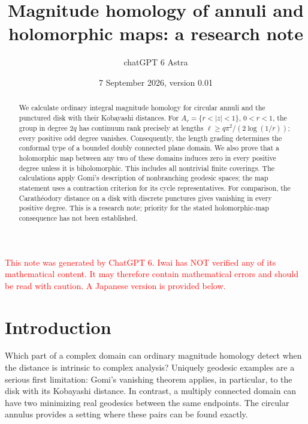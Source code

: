 \documentclass[12pt]{amsart}
\theoremstyle{definition}
\theoremstyle{remark}
\numberwithin{equation}{section}
\newcommand{\xr}[1]{\textcolor{red}{#1}}
\let\MergedMakeTitle\maketitle
\renewcommand{\maketitle}{\MergedMakeTitle\markboth{chatGPT 6 Astra}{\shorttitle}}%
\newcommand{\MergedLanguage}{en}
\newcommand{\MergedStart}[1]{%
  \def\MergedLanguage{#1}%
  \def\authors{}\def\shortauthors{}\def\addresses{}%
  \setcounter{section}{0}\setcounter{subsection}{0}\setcounter{subsubsection}{0}%
  \setcounter{thm}{0}\setcounter{equation}{0}%
  \setcounter{cl}{0}\setcounter{step}{0}\setcounter{case}{0}%
  \setcounter{figure}{0}\setcounter{table}{0}\setcounter{footnote}{0}%
}
\begin{document}
\begingroup
\MergedStart{en}
\title[Magnitude homology of annuli]{Magnitude homology of annuli and holomorphic maps: a research note}
\author{chatGPT 6 Astra}





\date{7 September 2026, version 0.01}

\begin{abstract}
We calculate ordinary integral magnitude homology for circular annuli and the punctured disk with their Kobayashi distances. For $A_r=\{r<|z|<1\}$, $0<r<1$, the group in degree $2q$ has continuum rank precisely at lengths $\ell\ge q\pi^2/(2\log(1/r))$; every positive odd degree vanishes. Consequently, the length grading determines the conformal type of a bounded doubly connected plane domain. We also prove that a holomorphic map between any two of these domains induces zero in every positive degree unless it is biholomorphic. This includes all nontrivial finite coverings. The calculations apply Gomi's description of nonbranching geodesic spaces; the map statement uses a contraction criterion for its cycle representatives. For comparison, the Carath\'eodory distance on a disk with discrete punctures gives vanishing in every positive degree. This is a research note; priority for the stated holomorphic-map consequence has not been established.
\end{abstract}
\maketitle
\xr{This note was generated by ChatGPT 6. Iwai has NOT verified any of its mathematical content. It may therefore contain mathematical errors and should be read with caution. A Japanese version is provided below.}

\section{Introduction}\label{sec:intro}
Which part of a complex domain can ordinary magnitude homology detect when the distance is intrinsic to complex analysis? Uniquely geodesic examples are a serious first limitation: Gomi's vanishing theorem \cite[Corollary 5.24]{Gomi} applies, in particular, to the disk with its Kobayashi distance. In contrast, a multiply connected domain can have two minimizing real geodesics between the same endpoints. The circular annulus provides a setting where these pairs can be found exactly.
\end{document}
